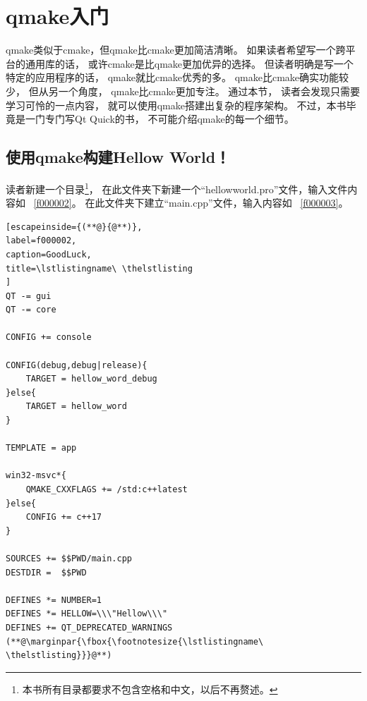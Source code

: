 ﻿




\FloatBarrier
\section{
qmake入门
}\label{s100310}


qmake类似于cmake，但qmake比cmake更加简洁清晰。
如果读者希望写一个跨平台的通用库的话，
或许cmake是比qmake更加优异的选择。
但读者明确是写一个特定的应用程序的话，
qmake就比cmake优秀的多。
qmake比cmake确实功能较少，
但从另一个角度，
qmake比cmake更加专注。
通过本节，
读者会发现只需要学习可怜的一点内容，
就可以使用qmake搭建出复杂的程序架构。
不过，本书毕竟是一门专门写Qt Quick的书，
不可能介绍qmake的每一个细节。

\FloatBarrier
\subsection{
使用qmake构建Hellow World！
}\label{ss000610}

读者新建一个目录\footnote{
本书所有目录都要求不包含空格和中文，以后不再赘述。
}，
在此文件夹下新建一个“hellow\underline{\hspace{0.5em}}world.pro”文件，输入文件内容如
\lstlistingname\ \ref{f000002}。
在此文件夹下建立“main.cpp”文件，输入内容如
\lstlistingname\ \ref{f000003}。

\FloatBarrier
\begin{lstlisting}[escapeinside={(**@}{@**)},
label=f000002,
caption=GoodLuck,
title=\lstlistingname\ \thelstlisting
]
QT -= gui
QT -= core

CONFIG += console

CONFIG(debug,debug|release){
    TARGET = hellow_word_debug
}else{
    TARGET = hellow_word
}

TEMPLATE = app

win32-msvc*{
    QMAKE_CXXFLAGS += /std:c++latest
}else{
    CONFIG += c++17
}

SOURCES += $$PWD/main.cpp
DESTDIR =  $$PWD

DEFINES *= NUMBER=1
DEFINES *= HELLOW=\\\"Hellow\\\"
DEFINES += QT_DEPRECATED_WARNINGS
(**@\marginpar{\fbox{\footnotesize{\lstlistingname\ \thelstlisting}}}@**)\end{lstlisting}          %

